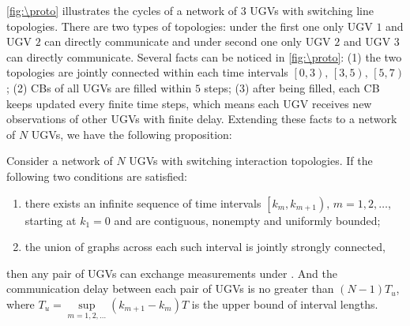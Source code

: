 	\medskip
	\cref{fig:\proto} illustrates the {\proto} cycles of a network of 3 UGVs with switching line topologies.
	There are two types of topologies: under the first one only UGV $1$ and UGV $2$ can directly communicate and under second one only UGV $2$ and UGV $3$ can directly communicate.
	Several facts can be noticed in \cref{fig:\proto}: 
	(1) the two topologies are jointly connected within each time intervals $\left[0,3 \right) ,\,\left[3,5 \right) ,\,\left[5,7 \right)$;
	(2)  CBs of all UGVs are filled within $5$ steps;
	(3) after being filled, each CB keeps updated every finite time steps, which means each UGV receives new observations of other UGVs with finite delay.
	Extending these facts to a network of $N$ UGVs, we have the following proposition:
	
	\begin{thm}\label{prop1}
		Consider a network of $N$ UGVs with switching interaction topologies.
		If the following two conditions are satisfied:
		\begin{enumerate}
			\item there exists an infinite sequence of time intervals $\left[k_m,k_{m+1} \right),\,m=1,2,\dots$, starting at $k_1=0$ and are contiguous, nonempty and uniformly bounded;
			\item the union of graphs across each such interval is jointly strongly connected,
		\end{enumerate}
		then any pair of UGVs can exchange measurements under \proto. And the communication delay between each pair of UGVs is no greater than \small$(N-1)T_u$\normalsize, where \small$T_u=\sup\limits_{m=1,2,\dots}\left( k_{m+1}-k_m\right) T$ \normalsize is the upper bound of interval lengths.
	\end{thm}
	
